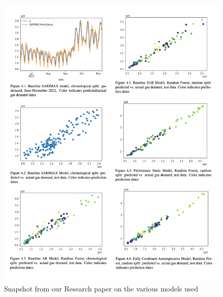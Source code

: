 \documentclass[
]{article}
\begin{document}
\begin{figure}
\includegraphics[width=1\linewidth]{figures/Gas2} \caption{Snapshot from our Research paper on the various models used}\label{fig:unnamed-chunk-2}
\end{figure}
\end{document}
